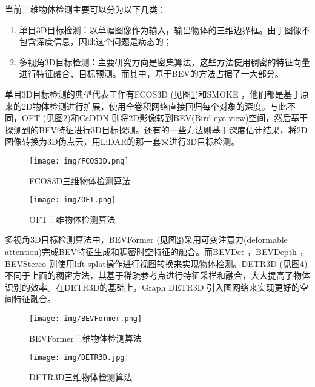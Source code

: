 \documentclass[12pt, twocolumn]{article}
\newcommand\normf{\fangsong}
\begin{document}
	当前三维物体检测主要可以分为以下几类：
	\begin{enumerate}
	\item 单目3D目标检测：以单幅图像作为输入，输出物体的三维边界框。由于图像不包含深度信息，因此这个问题是病态的；
	
	\item 多视角3D目标检测：主要研究方向是密集算法，这些方法使用稠密的特征向量进行特征融合、目标预测。而其中，基于BEV的方法占据了一大部分。
	\end{enumerate}
	单目3D目标检测的典型代表工作有FCOS3D \cite{wang2021fcos3d} (见图\ref{fig:FCOS3D三维物体检测算法})和SMOKE \cite{liu2020smoke}，他们都是基于原来的2D物体检测进行扩展，使用全卷积网络直接回归每个对象的深度。与此不同，OFT (见图\ref{fig:OFT三维物体检测算法})和CaDDN \cite{reading2021categorical} 则将2D影像转到BEV(Bird-eye-view)空间，然后基于探测到的BEV特征进行3D目标探测。还有的一些方法则基于深度估计结果，将2D图像转换为3D伪点云，用LiDAR的那一套来进行3D目标检测。

	\begin{figure}[h]
		\centering
		\texttt{[image: img/FCOS3D.png]}
		\caption{\normf FCOS3D三维物体检测算法}
		\label{fig:FCOS3D三维物体检测算法}
	\end{figure}
	\begin{figure}[h]
		\centering
		\texttt{[image: img/OFT.png]}
		\caption{\normf OFT三维物体检测算法}
		\label{fig:OFT三维物体检测算法}
	\end{figure}
	
	多视角3D目标检测算法中，BEVFormer \cite{li2022bevformer} (见图\ref{fig:BEVFormer三维物体检测算法})采用可变注意力(deformable attention)完成BEV特征生成和稠密时空特征的融合。而BEVDet \cite{huang2021bevdet}，BEVDepth \cite{li2023bevdepth}，BEVStereo \cite{li2023bevstereo}则使用lift-splat操作进行视图转换来实现物体检测。DETR3D \cite{wang2022detr3d} (见图\ref{fig:DETR3D三维物体检测算法})不同于上面的稠密方法，其基于稀疏参考点进行特征采样和融合，大大提高了物体识别的效率。在DETR3D的基础上，Graph DETR3D \cite{chen2022graph} 引入图网络来实现更好的空间特征融合。
	\begin{figure}[h]
		\centering
		\texttt{[image: img/BEVFormer.png]}
		\caption{\normf BEVFormer三维物体检测算法}
		\label{fig:BEVFormer三维物体检测算法}
	\end{figure}
	\begin{figure}[h]
		\centering
		\texttt{[image: img/DETR3D.jpg]}
		\caption{\normf DETR3D三维物体检测算法}
		\label{fig:DETR3D三维物体检测算法}
	\end{figure}
	
\end{document}

